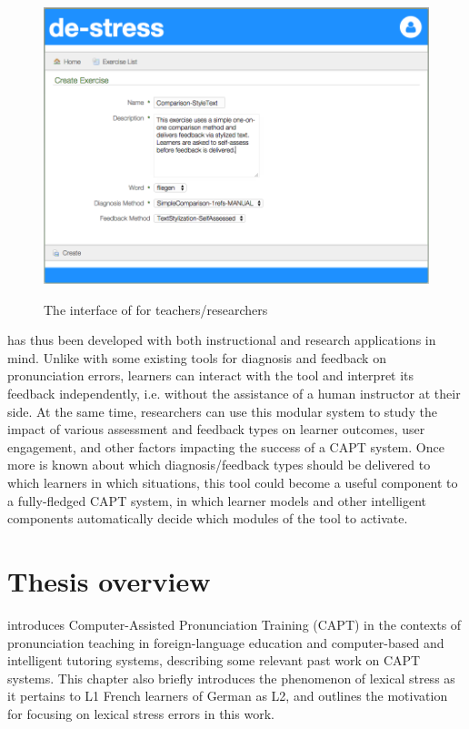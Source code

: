 	\begin{figure}
		\centering
		\caption{The interface of  for teachers/researchers}
		\includegraphics[width=.9\textwidth]{img/screenshots/TeacherInterface-userIcon}
		\label{fig:interface:teacher}
	\end{figure}

 has thus been developed with both instructional and research applications in mind.
Unlike with some existing tools for diagnosis and feedback on pronunciation errors, learners can interact with the tool and interpret its feedback independently, i.e. without the assistance of a human instructor at their side.
At the same time, researchers can use this modular system to study the impact of various assessment and feedback types on learner outcomes, user engagement, and other factors impacting the success of a CAPT system. 
%
Once more is known about which diagnosis/feedback types should be delivered to which learners in which situations, this tool could become a useful component to a fully-fledged CAPT system, in which learner models and other intelligent components automatically decide which modules of the tool to activate. 



\section{Thesis overview}
\label{sec:intro:overview}


 introduces Computer-Assisted Pronunciation Training (CAPT) in the contexts of pronunciation teaching in foreign-language education and computer-based and intelligent tutoring systems, describing some relevant past work on CAPT systems. This chapter also briefly 
introduces the phenomenon of lexical stress as it pertains to L1 French learners of German as L2, and outlines
the motivation for focusing on lexical stress errors in this work.


